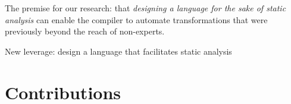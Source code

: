 The premise for our research: that {\it designing a language for the
  sake of static analysis} can enable the compiler to automate
transformations that were previously beyond the reach of non-experts.

New leverage: design a language that facilitates static analysis


\section{Contributions}

